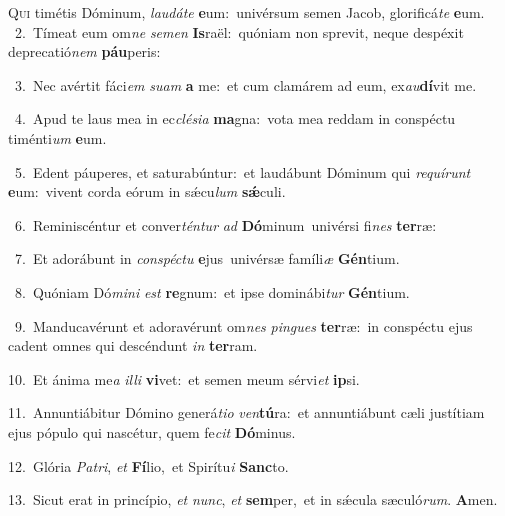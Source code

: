 \lettrine{\initial\textcolor{\initialcolor}{Q}}{ui} timétis Dóminum, \textit{lau}\-\textit{dá}\textit{te} \textbf{e}\-um:~\star univérsum semen Jacob, glorificá\textit{te} \textbf{e}\-um.\\
{\numbfont\textcolor{\numbcolor}{~2.}}~Tímeat eum om\textit{ne} \textit{se}\-\textit{men} \textbf{Is}\-raël:~\star quóniam non sprevit, neque despéxit deprecatió\textit{nem} \textbf{páu}\-peris:\par
{\numbfont\textcolor{\numbcolor}{~3.}}~Nec avértit fáci\textit{em} \textit{su}\-\textit{am} \textbf{a} me:~\star et cum clamárem ad eum, ex\-\textit{au}\-\textbf{dí}vit me.\par
{\numbfont\textcolor{\numbcolor}{~4.}}~Apud te laus mea in ec\-\textit{clé}\-\textit{si}\textit{a} \textbf{ma}\-gna:~\star vota mea reddam in conspéctu timénti\textit{um} \textbf{e}\-um.\par
{\numbfont\textcolor{\numbcolor}{~5.}}~Edent páuperes, et saturabúntur:~\dagger et laudábunt Dóminum qui \textit{re}\-\textit{quí}\textit{runt} \textbf{e}\-um:~\star vivent corda eórum in sǽcu\textit{lum} \textbf{sǽ}\-culi.\par
{\numbfont\textcolor{\numbcolor}{~6.}}~Reminiscéntur et conver\-\textit{tén}\-\textit{tur} \textit{ad} \textbf{Dó}\-minum~\star univérsi fi\textit{nes} \textbf{ter}\-ræ:\par
{\numbfont\textcolor{\numbcolor}{~7.}}~Et adorábunt in \textit{con}\-\textit{spéc}\textit{tu} \textbf{e}\-jus~\star univérsæ famíli\textit{æ} \textbf{Gén}\-tium.\par
{\numbfont\textcolor{\numbcolor}{~8.}}~Quóniam Dó\-\textit{mi}\-\textit{ni} \textit{est} \textbf{re}\-gnum:~\star et ipse dominábi\textit{tur} \textbf{Gén}\-tium.\par
{\numbfont\textcolor{\numbcolor}{~9.}}~Manducavérunt et adoravérunt om\textit{nes} \textit{pin}\-\textit{gues} \textbf{ter}\-ræ:~\star in conspéctu ejus cadent omnes qui descéndunt \textit{in} \textbf{ter}\-ram.\par
{\numbfont\textcolor{\numbcolor}{10.}}~Et ánima me\textit{a} \textit{il}\-\textit{li} \textbf{vi}\-vet:~\star et semen meum sérvi\textit{et} \textbf{ip}\-si.\par
{\numbfont\textcolor{\numbcolor}{11.}}~Annuntiábitur Dómino generá\-\textit{ti}\-\textit{o} \textit{ven}\-\textbf{tú}ra:~\star et annuntiábunt cæli justítiam ejus pópulo qui nascétur, quem fe\textit{cit} \textbf{Dó}\-minus.\par
{\numbfont\textcolor{\numbcolor}{12.}}~Glória \textit{Pa}\-\textit{tri}, \textit{et} \textbf{Fí}\-lio,~\star et Spirítu\textit{i} \textbf{Sanc}\-to.\par
{\numbfont\textcolor{\numbcolor}{13.}}~Sicut erat in princípio, \textit{et} \textit{nunc}\-, \textit{et} \textbf{sem}\-per,~\star et in sǽcula sæculó\-\textit{rum}\-. \textbf{A}\-men.\par
